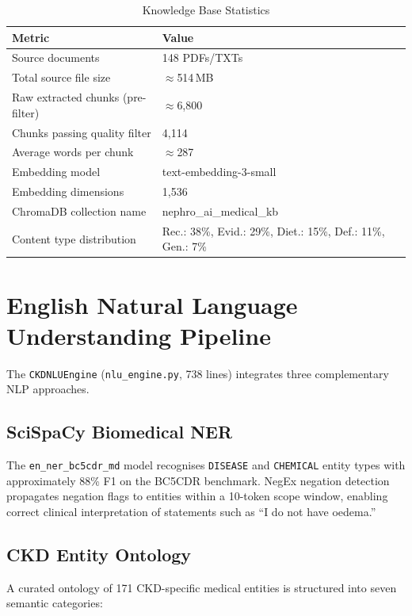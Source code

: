 \documentclass[12pt,a4paper]{report}
\begin{document}
\begin{table}[H]
\centering
\caption{Knowledge Base Statistics}
\label{tab:kb}
\renewcommand{\arraystretch}{1.3}
\begin{tabularx}{\textwidth}{@{}Xl@{}}
\toprule
\textbf{Metric} & \textbf{Value} \\
\midrule
Source documents & 148 PDFs/TXTs \\
Total source file size & $\approx$514\,MB \\
Raw extracted chunks (pre-filter) & $\approx$6,800 \\
Chunks passing quality filter & 4,114 \\
Average words per chunk & $\approx$287 \\
Embedding model & text-embedding-3-small \\
Embedding dimensions & 1,536 \\
ChromaDB collection name & nephro\_ai\_medical\_kb \\
Content type distribution & Rec.: 38\%, Evid.: 29\%, Diet.: 15\%, Def.: 11\%, Gen.: 7\% \\
\bottomrule
\end{tabularx}
\end{table}

\section{English Natural Language Understanding Pipeline}

The \texttt{CKDNLUEngine} (\texttt{nlu\_engine.py}, 738 lines) integrates three complementary NLP approaches.

\subsection{SciSpaCy Biomedical NER}

The \texttt{en\_ner\_bc5cdr\_md} model recognises \texttt{DISEASE} and \texttt{CHEMICAL} entity types with approximately 88\% F1 on the BC5CDR benchmark. NegEx negation detection propagates negation flags to entities within a 10-token scope window, enabling correct clinical interpretation of statements such as ``I do not have oedema.''

\subsection{CKD Entity Ontology}

A curated ontology of 171 CKD-specific medical entities is structured into seven semantic categories:
\end{document}
